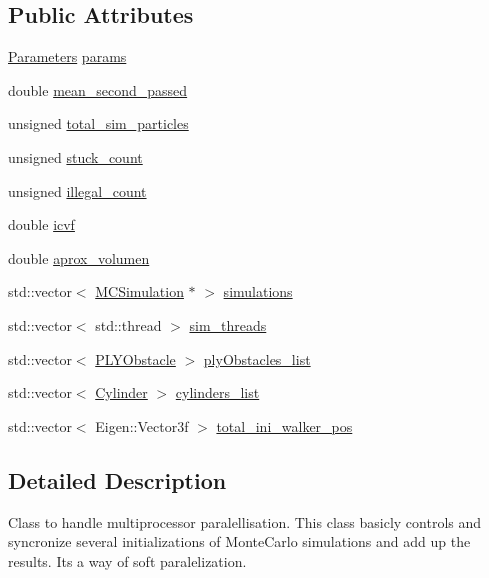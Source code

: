 \subsection*{Public Attributes}
\begin{DoxyCompactItemize}
\item 
\hyperlink{class_parameters}{Parameters} \hyperlink{class_parallel_m_c_simulation_a83f856aaa88a403c657c7b8234deee7a}{params}
\item 
double \hyperlink{class_parallel_m_c_simulation_ad122df5454bb26a56e89c9077560a33d}{mean\+\_\+second\+\_\+passed}
\item 
unsigned \hyperlink{class_parallel_m_c_simulation_a18326e05c32fac82264d7351d78a7433}{total\+\_\+sim\+\_\+particles}
\item 
unsigned \hyperlink{class_parallel_m_c_simulation_a6ee1dfd6e695ec5ec7d4c2ed94f233cf}{stuck\+\_\+count}
\item 
unsigned \hyperlink{class_parallel_m_c_simulation_ae667ec358689a3a7b42876b401a5fce5}{illegal\+\_\+count}
\item 
double \hyperlink{class_parallel_m_c_simulation_a871e3fdace01984a533792dd49bebd1b}{icvf}
\item 
double \hyperlink{class_parallel_m_c_simulation_aa51edc0c79c6ae66ddd0046d21b871d4}{aprox\+\_\+volumen}
\item 
std\+::vector$<$ \hyperlink{class_m_c_simulation}{M\+C\+Simulation} $\ast$ $>$ \hyperlink{class_parallel_m_c_simulation_af16d292f007b8391122a035022422ed5}{simulations}
\item 
std\+::vector$<$ std\+::thread $>$ \hyperlink{class_parallel_m_c_simulation_a2a0f1cc2812c1a35e5e38d9d9ddde78b}{sim\+\_\+threads}
\item 
std\+::vector$<$ \hyperlink{class_p_l_y_obstacle}{P\+L\+Y\+Obstacle} $>$ \hyperlink{class_parallel_m_c_simulation_aa90f4d989bc868b6d225c0c5b9fe832a}{ply\+Obstacles\+\_\+list}
\item 
std\+::vector$<$ \hyperlink{class_cylinder}{Cylinder} $>$ \hyperlink{class_parallel_m_c_simulation_a4c36ff5327e9f19258fed5d64d48fdb8}{cylinders\+\_\+list}
\item 
std\+::vector$<$ Eigen\+::\+Vector3f $>$ \hyperlink{class_parallel_m_c_simulation_a5efe5faa45e57e6ff3827e9ec9e52a64}{total\+\_\+ini\+\_\+walker\+\_\+pos}
\end{DoxyCompactItemize}


\subsection{Detailed Description}
Class to handle multiprocessor paralellisation. This class basicly controls and syncronize several initializations of Monte\+Carlo simulations and add up the results. It\textquotesingle{}s a way of soft paralelization. 


